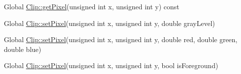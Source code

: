 \label{test__test000001}
\hypertarget{test__test000001}{}
 \begin{description}
\item[Global \hyperlink{class_clip_74eded11c0dcbd2b10b453074cbb8b84}{Clip::getPixel}(unsigned int x, unsigned int y) const  ]\end{description}


\label{test__test000002}
\hypertarget{test__test000002}{}
 \begin{description}
\item[Global \hyperlink{class_clip_3c48493242de7453438ed0e8d0ea74df}{Clip::setPixel}(unsigned int x, unsigned int y, double grayLevel) ]\end{description}


\label{test__test000003}
\hypertarget{test__test000003}{}
 \begin{description}
\item[Global \hyperlink{class_clip_1e28a9ed2676460de4b5b9ab1b985f4c}{Clip::setPixel}(unsigned int x, unsigned int y, double red, double green, double blue) ]\end{description}


\label{test__test000004}
\hypertarget{test__test000004}{}
 \begin{description}
\item[Global \hyperlink{class_clip_9e78d68c58016aaff8c65ddac29ed07f}{Clip::setPixel}(unsigned int x, unsigned int y, bool isForeground) ]\end{description}
